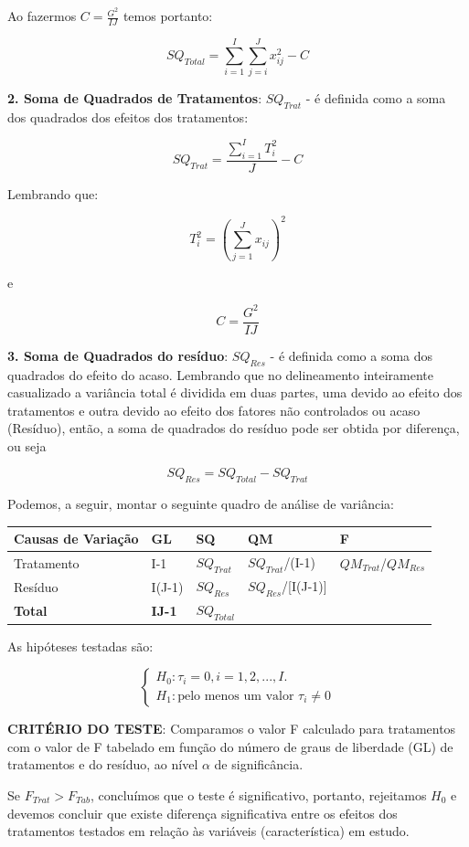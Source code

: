 \documentclass[
]{book}
\begin{document}
Ao fazermos \(C = \frac{G^2}{IJ}\) temos portanto:

\[
SQ_{Total} = \sum_{i=1}^I\sum_{j=i}^Jx_{ij}^2 - C
\]

\textbf{2. Soma de Quadrados de Tratamentos}: \(SQ_{Trat}\) - é definida como a soma dos quadrados dos efeitos dos tratamentos:

\[
SQ_{Trat} = \frac{\sum_{i=1}^IT_i^2}{J} - C
\]

Lembrando que:

\[
T_i^2 = \left ( \sum_{j=1}^J{x_{ij}} \right)^2
\]

e

\[
C = \frac{G^2}{IJ}
\]

\textbf{3. Soma de Quadrados do resíduo}: \(SQ_{Res}\) - é definida como a soma dos quadrados do efeito do acaso. Lembrando que no delineamento inteiramente casualizado a variância total é dividida em duas partes, uma devido ao efeito dos tratamentos e outra devido ao efeito dos fatores não controlados ou acaso (Resíduo), então, a soma de quadrados do resíduo pode ser obtida por diferença, ou seja

\[
SQ_{Res} = SQ_{Total} - SQ_{Trat}
\]

Podemos, a seguir, montar o seguinte quadro de análise de variância:

\begin{longtable}[]{@{}lllll@{}}
\toprule
Causas de Variação & GL & SQ & QM & F\tabularnewline
\midrule
\endhead
Tratamento & I-1 & \(SQ_{Trat}\) & \(SQ_{Trat}\)/(I-1) & \(QM_{Trat}\)/\(QM_{Res}\)\tabularnewline
Resíduo & I(J-1) & \(SQ_{Res}\) & \(SQ_{Res}\)/{[}I(J-1){]} &\tabularnewline
\textbf{Total} & \textbf{IJ-1} & \(SQ_{Total}\) & &\tabularnewline
\bottomrule
\end{longtable}

As hipóteses testadas são:

\[
\begin{cases} H_0: \tau_i = 0, i=1,2,...,I. \\ 
H_1: \text{pelo menos um valor } \tau_i \neq 0
\end{cases}
\]

\textbf{CRITÉRIO DO TESTE}: Comparamos o valor F calculado para tratamentos com o valor de F tabelado em função do número de graus de liberdade (GL) de tratamentos e do resíduo, ao nível \(\alpha\) de significância.

Se \(F_{Trat} > F_{Tab}\), concluímos que o teste é significativo, portanto, rejeitamos \(H_0\) e devemos concluir que existe diferença significativa entre os efeitos dos tratamentos testados em relação às variáveis (característica) em estudo.
\end{document}
